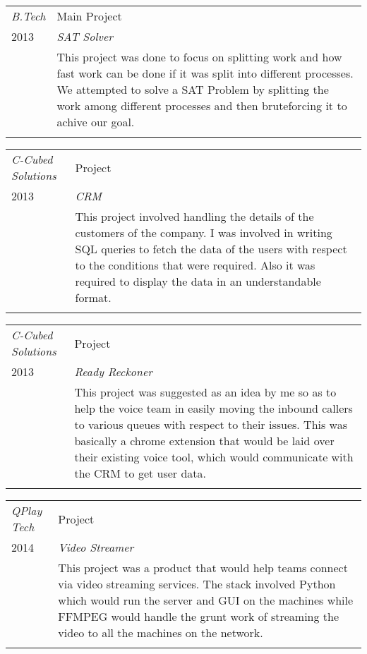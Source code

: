 \documentclass[a4paper]{article}
\begin{document}
\begin{tabular}{p{4cm}|p{13cm}}
\emph{B.Tech} & Main Project \\
\textsc{2013} & \emph{SAT Solver} \\
& \normalsize{This project was done to focus on splitting work and how fast work can be done if it was split into different processes. We attempted to solve a SAT Problem by splitting the work among different processes and then bruteforcing it to achive our goal. 
}
\\
\multicolumn{2}{c}{}
\end{tabular}

\begin{tabular}{p{4cm}|p{13cm}}
\emph{C-Cubed Solutions} & Project \\
\textsc{2013} & \emph{CRM} \\
& \normalsize{This project involved handling the details of the customers of the company. I was involved in writing SQL queries to fetch the data of the users with respect to the conditions that were required. Also it was required to display the data in an understandable format.
}
\\
\multicolumn{2}{c}{}
\end{tabular}

\begin{tabular}{p{4cm}|p{13cm}}
\emph{C-Cubed Solutions} & Project \\
\textsc{2013} & \emph{Ready Reckoner} \\
& \normalsize{This project was suggested as an idea by me so as to help the voice team in easily moving the inbound callers to various queues with respect to their issues. This was basically a chrome extension that would be laid over their existing voice tool, which would communicate with the CRM to get user data.
}
\\
\multicolumn{2}{c}{}
\end{tabular}

\begin{tabular}{p{4cm}|p{13cm}}
\emph{QPlay Tech} & Project \\
\textsc{2014} & \emph{Video Streamer} \\
& \normalsize{This project was a product that would help teams connect via video streaming services. The stack involved Python which would run the server and GUI on the machines while FFMPEG would handle the grunt work of streaming the video to all the machines on the network.
}
\\
\multicolumn{2}{c}{}
\end{tabular}
\end{document}
